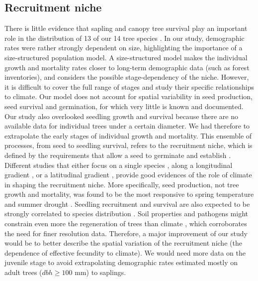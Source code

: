 \subsection{Recruitment niche}
There is little evidence that sapling and canopy tree survival play an important role in the distribution of 13 of our 14 tree species \citep[\textit{Picea mariana} is missing]{Canham2017}. In our study, demographic rates were rather strongly dependent on size, highlighting the importance of a size-structured population model. A size-structured model makes the individual growth and mortality rates closer to long-term demographic data (such as forest inventories), and considers the possible stage-dependency of the niche. However, it is difficult to cover the full range of stages and study their specific relationships to climate. Our model does not account for spatial variability in seed production, seed survival and germination, for which very little is known and documented. Our study also overlooked seedling growth and survival because there are no available data for individual trees under a certain diameter. We had therefore to extrapolate the early stages of individual growth and mortality. This ensemble of processes, from seed to seedling survival, refers to the recruitment niche, which is defined by the requirements that allow a seed to germinate and establish \citep{Valdez2019}. Different studies that either focus on a single species \citep[\textit{Acer saccharum}]{Solarik2016}, along a longitudinal gradient \citep{CLARK2011}, or a latitudinal gradient \citep {Boisvert-Marsh2019}, provide good evidences of the role of climate in shaping the recruitment niche. More specifically, seed production, not tree growth and mortality, was found to be the most responsive to spring temperature and summer drought \citep[11 sites in the Appalachians, Piedmont, and North Carolina]{CLARK2011}. Seedling recruitment and survival are also expected to be strongly correlated to species distribution \citep{Vanderwel2013, Valdez2019, Solarik2019}. Soil properties and pathogens might constrain even more the regeneration of trees than climate \citep{Brown2014}, which corroborates the need for finer resolution data. Therefore, a major improvement of our study would be to better describe the spatial variation of the recruitment niche (\ie the dependence of effective fecundity to climate). We would need more data on the juvenile stage to avoid extrapolating demographic rates estimated mostly on adult trees ($ dbh \geqslant 100 $ mm) to saplings. \\


